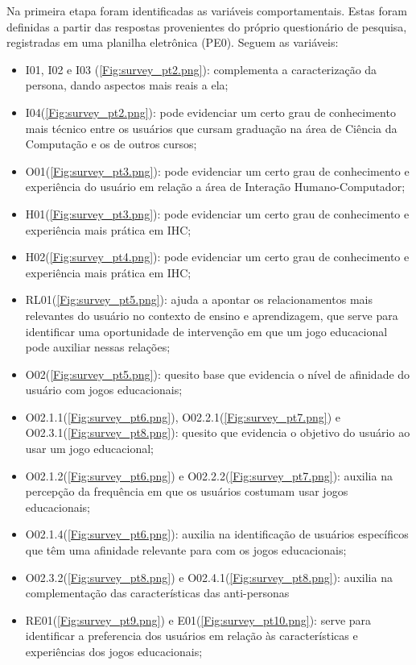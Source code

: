 \begin{apendicesenv}
Na primeira etapa foram identificadas as variáveis comportamentais. Estas foram definidas a partir das respostas provenientes do próprio questionário de pesquisa, registradas em uma planilha eletrônica (PE0). Seguem as variáveis:

\begin{itemize}
    \item I01, I02 e I03 (\ref{Fig:survey_pt2.png}): complementa a caracterização da persona, dando aspectos mais reais a ela;
    \item I04(\ref{Fig:survey_pt2.png}): pode evidenciar um certo grau de conhecimento mais técnico entre os usuários que cursam graduação na área de Ciência da Computação e os de outros cursos;
    \item O01(\ref{Fig:survey_pt3.png}): pode evidenciar um certo grau de conhecimento e experiência do usuário em relação a área de Interação Humano-Computador;
    \item H01(\ref{Fig:survey_pt3.png}): pode evidenciar um certo grau de conhecimento e experiência mais prática em IHC;
    \item H02(\ref{Fig:survey_pt4.png}): pode evidenciar um certo grau de conhecimento e experiência mais prática em IHC;
    \item RL01(\ref{Fig:survey_pt5.png}): ajuda a apontar os relacionamentos mais relevantes do usuário no contexto de ensino e aprendizagem, que serve para identificar uma oportunidade de intervenção em que um jogo educacional pode auxiliar nessas relações;
    \item O02(\ref{Fig:survey_pt5.png}): quesito base que evidencia o nível de afinidade do usuário com jogos educacionais;
    \item O02.1.1(\ref{Fig:survey_pt6.png}), O02.2.1(\ref{Fig:survey_pt7.png}) e O02.3.1(\ref{Fig:survey_pt8.png}): quesito que evidencia o objetivo do usuário ao usar um jogo educacional;
    \item O02.1.2(\ref{Fig:survey_pt6.png}) e O02.2.2(\ref{Fig:survey_pt7.png}): auxilia na percepção da frequência em que os usuários costumam usar jogos educacionais;
    \item O02.1.4(\ref{Fig:survey_pt6.png}): auxilia na identificação de usuários específicos que têm uma afinidade relevante para com os jogos educacionais; 
    \item O02.3.2(\ref{Fig:survey_pt8.png}) e O02.4.1(\ref{Fig:survey_pt8.png}): auxilia na complementação das características das anti-personas
    \item RE01(\ref{Fig:survey_pt9.png}) e E01(\ref{Fig:survey_pt10.png}): serve para identificar a preferencia dos usuários em relação às características e experiências dos jogos educacionais;
\end{itemize}


\end{apendicesenv}

